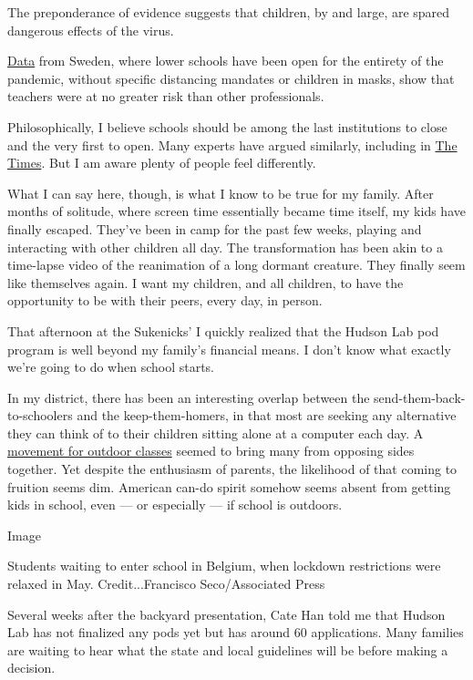 The preponderance of evidence suggests that children, by and large, are
spared dangerous effects of the virus.

\href{https://www.folkhalsomyndigheten.se/contentassets/5e248b82cc284971a1c5fd922e7770f8/forekomst-covid-19-olika-yrkesgrupper.pdf}{Data}
from Sweden, where lower schools have been open for the entirety of the
pandemic, without specific distancing mandates or children in masks,
show that teachers were at no greater risk than other professionals.

Philosophically, I believe schools should be among the last institutions
to close and the very first to open. Many experts have argued similarly,
including in
\href{https://www.nytimes3xbfgragh.onion/2020/07/01/opinion/coronavirus-schools.html}{The
Times}. But I am aware plenty of people feel differently.

What I can say here, though, is what I know to be true for my family.
After months of solitude, where screen time essentially became time
itself, my kids have finally escaped. They've been in camp for the past
few weeks, playing and interacting with other children all day. The
transformation has been akin to a time-lapse video of the reanimation of
a long dormant creature. They finally seem like themselves again. I want
my children, and all children, to have the opportunity to be with their
peers, every day, in person.

That afternoon at the Sukenicks' I quickly realized that the Hudson Lab
pod program is well beyond my family's financial means. I don't know
what exactly we're going to do when school starts.

In my district, there has been an interesting overlap between the
send-them-back-to-schoolers and the keep-them-homers, in that most are
seeking any alternative they can think of to their children sitting
alone at a computer each day. A
\href{https://www.nytimes3xbfgragh.onion/2020/07/17/nyregion/coronavirus-nyc-schools-reopening-outdoors.html}{movement
for outdoor classes} seemed to bring many from opposing sides together.
Yet despite the enthusiasm of parents, the likelihood of that coming to
fruition seems dim. American can-do spirit somehow seems absent from
getting kids in school, even --- or especially --- if school is
outdoors.

Image

Students waiting to enter school in Belgium, when lockdown restrictions
were relaxed in May. Credit...Francisco Seco/Associated Press

Several weeks after the backyard presentation, Cate Han told me that
Hudson Lab has not finalized any pods yet but has around 60
applications. Many families are waiting to hear what the state and local
guidelines will be before making a decision.

